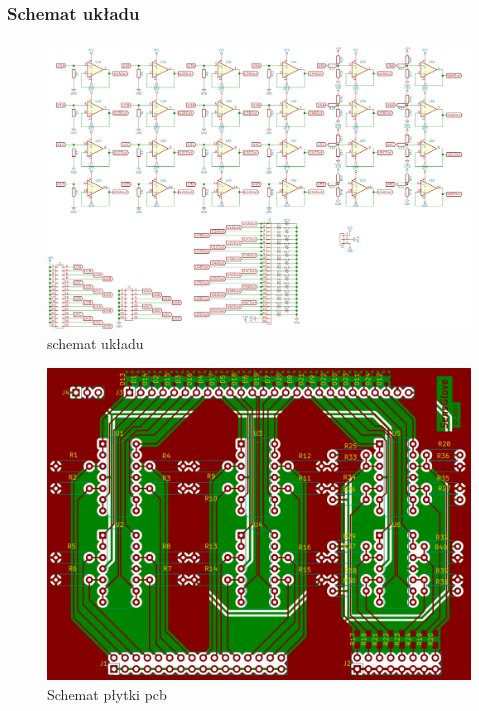 ﻿\documentclass{article}
\begin{document}
\subsubsection{Schemat układu}
\begin{figure}[!h]
	\centering
	\includegraphics[width=\textwidth]{schemat.png}
	\caption{schemat układu}
	\label{rys:schemat układu}
\end{figure}


\begin{figure}[h!]
	\centering
	\includegraphics[width=\textwidth]{pcb.png}
	\caption{Schemat płytki pcb}
	\label{rys:pcb}
\end{figure}
\end{document}
